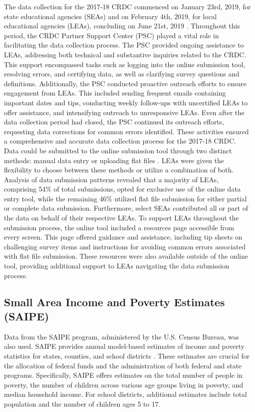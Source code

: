 \documentclass[sn-mathphys-num]{sn-jnl}%
\theoremstyle{thmstyleone}%
\theoremstyle{thmstyletwo}%
\theoremstyle{thmstylethree}%
\begin{document}
The data collection for the 2017-18 CRDC commenced on January 23rd, 2019, for state educational agencies (SEAs) and on February 4th, 2019, for local educational agencies (LEAs), concluding on June 21st, 2019 \cite{crdc_manual}. Throughout this period, the CRDC Partner Support Center (PSC) played a vital role in facilitating the data collection process. The PSC provided ongoing assistance to LEAs, addressing both technical and substantive inquiries related to the CRDC. This support encompassed tasks such as logging into the online submission tool, resolving errors, and certifying data, as well as clarifying survey questions and definitions. Additionally, the PSC conducted proactive outreach efforts to ensure engagement from LEAs. This included sending frequent emails containing important dates and tips, conducting weekly follow-ups with uncertified LEAs to offer assistance, and intensifying outreach to unresponsive LEAs. Even after the data collection period had closed, the PSC continued its outreach efforts, requesting data corrections for common errors identified. These activities ensured a comprehensive and accurate data collection process for the 2017-18 CRDC.\\

Data could be submitted to the online submission tool through two distinct methods: manual data entry or uploading flat files \cite{crdc_manual}. LEAs were given the flexibility to choose between these methods or utilize a combination of both. Analysis of data submission patterns revealed that a majority of LEAs, comprising 54$\%$ of total submissions, opted for exclusive use of the online data entry tool, while the remaining 46$\%$ utilized flat file submission for either partial or complete data submission. Furthermore, select SEAs contributed all or part of the data on behalf of their respective LEAs. To support LEAs throughout the submission process, the online tool included a resources page accessible from every screen. This page offered guidance and assistance, including tip sheets on challenging survey items and instructions for avoiding common errors associated with flat file submission. These resources were also available outside of the online tool, providing additional support to LEAs navigating the data submission process.\\

\subsection{Small Area Income and Poverty Estimates (SAIPE)}
Data from the SAIPE program, administered by the U.S. Census Bureau, was also used. SAIPE provides annual model-based estimates of income and poverty statistics for states, counties, and school districts \cite{saipe_about}. These estimates are crucial for the allocation of federal funds and the administration of both federal and state programs. Specifically, SAIPE offers estimates on the total number of people in poverty, the number of children across various age groups living in poverty, and median household income. For school districts, additional estimates include total population and the number of children ages 5 to 17.\\
\end{document}
